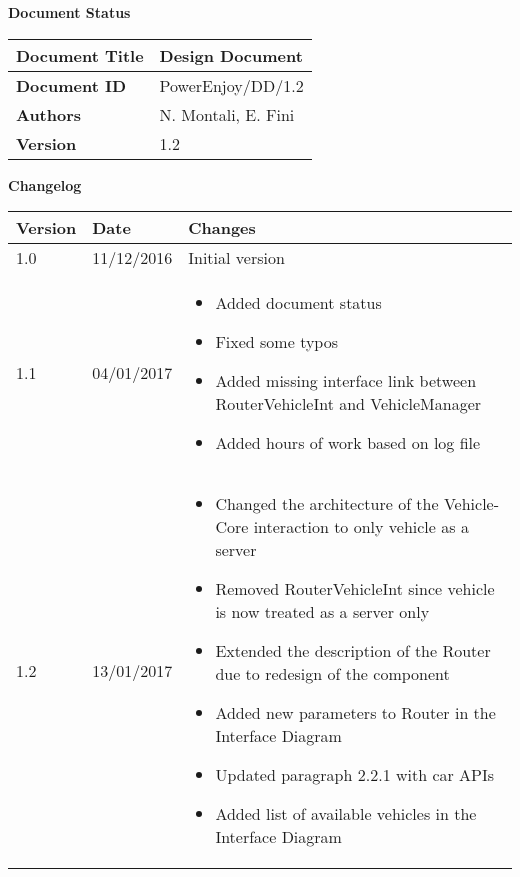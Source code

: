 \textbf{\Huge Document Status}
\begin{center}
    \begin{tabular}{ | l | p{10cm} |}
    \hline
    \textbf{Document Title} & Design Document \\ \hline
    \textbf{Document ID} & PowerEnjoy/DD/1.2 \\ \hline
    \textbf{Authors} & N. Montali, E. Fini \\ \hline
    \textbf{Version} & 1.2 \\ \hline
    \end{tabular}
\textbf{\Large Changelog}
     \begin{tabular}{ | l | l | p{10cm} |}
    \hline
    \textbf{Version} & \textbf{Date} & \textbf{Changes} \\ \hline
    1.0 & 11/12/2016 & Initial version \\ \hline
    1.1 & 04/01/2017 & \begin{itemize}
    	\item Added document status 
	\item Fixed some typos
	\item Added missing interface link between RouterVehicleInt and VehicleManager
	\item Added hours of work based on log file
    \end{itemize}
    \\ \hline
    1.2 & 13/01/2017 & \begin{itemize}
    	\item Changed the architecture of the Vehicle-Core interaction to only vehicle as a server
	\item Removed RouterVehicleInt since vehicle is now treated as a server only
	\item Extended the description of the Router due to redesign of the component
	\item Added new parameters to Router in the Interface Diagram 
	\item Updated paragraph 2.2.1 with car APIs
	\item Added list of available vehicles in the Interface Diagram
    \end{itemize}
    \\ \hline
    \end{tabular}
\end{center}